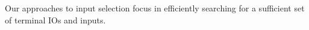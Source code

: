 \documentclass[sigconf,screen,nonacm]{acmart}
\begin{document}


Our approaches to input selection focus in efficiently searching for a
sufficient set of terminal IOs and inputs.


\end{document}
